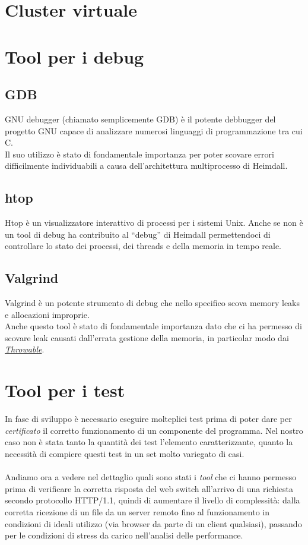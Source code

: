\documentclass[italian]{tktltiki2}
\begin{document}
\newpage
\section{Cluster virtuale}

\newpage
\section{Tool per i debug}
\subsection{GDB}
GNU debugger (chiamato semplicemente GDB)\cite{gdb} è il potente debbugger del progetto GNU capace di analizzare numerosi linguaggi di programmazione tra cui C.
\\
Il suo utilizzo è stato di fondamentale importanza per poter scovare errori difficilmente individuabili a causa dell'architettura multiprocesso di Heimdall.

\subsection{htop}
Htop\cite{htop} è un visualizzatore interattivo di processi per i sistemi Unix. Anche se non è un tool di debug ha contribuito al ``debug'' di Heimdall permettendoci di controllare lo stato dei processi, dei threads e della memoria in tempo reale.

\subsection{Valgrind}
Valgrind\cite{valgrind} è un potente strumento di debug che nello specifico scova memory leaks e allocazioni improprie.
\\
Anche questo tool è stato di fondamentale importanza dato che ci ha permesso di scovare leak causati dall'errata gestione della memoria, in particolar modo dai \hyperref[sec:errors]{\emph{Throwable}}.

\newpage
\section{Tool per i test}
In fase di sviluppo è necessario eseguire molteplici test prima di poter dare per \emph{certificato} il corretto funzionamento di un componente del programma. Nel nostro caso non è stata tanto la quantità dei test l'elemento caratterizzante, quanto la necessità di compiere questi test in un set molto variegato di casi. \\\\
Andiamo ora a vedere nel dettaglio quali sono stati i \emph{tool} che ci hanno permesso prima di verificare la corretta risposta del web switch all'arrivo di una richiesta secondo protocollo HTTP/1.1, quindi di aumentare il livello di complessità: dalla corretta ricezione di un file da un server remoto fino al funzionamento in condizioni di ideali utilizzo (via browser da parte di un client qualsiasi), passando per le condizioni di stress da carico nell'analisi delle performance.
\end{document}
